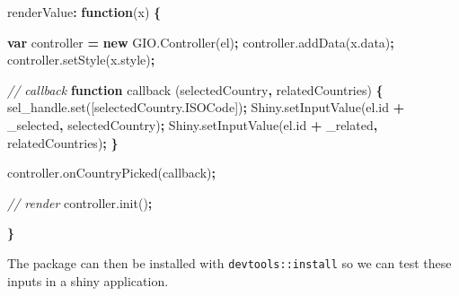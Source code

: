\documentclass[
]{krantz}
\makeatletter
\newenvironment{Shaded}{\begin{snugshade}}{\end{snugshade}}
\newcommand{\AttributeTok}[1]{\textcolor[rgb]{0.61,0.61,0.61}{#1}}
\newcommand{\CommentTok}[1]{\textcolor[rgb]{0.37,0.37,0.37}{\textit{#1}}}
\newcommand{\KeywordTok}[1]{\textcolor[rgb]{0.27,0.27,0.27}{\textbf{#1}}}
\newcommand{\NormalTok}[1]{#1}
\newcommand{\OperatorTok}[1]{\textcolor[rgb]{0.43,0.43,0.43}{\textbf{#1}}}
\newcommand{\StringTok}[1]{\textcolor[rgb]{0.5,0.5,0.5}{#1}}
\newcommand{\VariableTok}[1]{\textcolor[rgb]{0,0,0}{#1}}
\newenvironment{kframe}{%
\medskip{}
\setlength{\fboxsep}{.8em}
 \def\at@end@of@kframe{}%
 \ifinner\ifhmode%
  \def\at@end@of@kframe{\end{minipage}}%
  \begin{minipage}{\columnwidth}%
 \fi\fi%
 \def\FrameCommand##1{\hskip\@totalleftmargin \hskip-\fboxsep
 \colorbox{shadecolor}{##1}\hskip-\fboxsep
     \hskip-\linewidth \hskip-\@totalleftmargin \hskip\columnwidth}%
 \MakeFramed {\advance\hsize-\width
   \@totalleftmargin\z@ \linewidth\hsize
   \@setminipage}}%
 {\par\unskip\endMakeFramed%
 \at@end@of@kframe}
\renewenvironment{Shaded}{\begin{kframe}}{\end{kframe}}
\makeatother
\begin{document}
\begin{Shaded}
\begin{Highlighting}[]
\NormalTok{renderValue}\OperatorTok{:} \KeywordTok{function}\NormalTok{(x) }\OperatorTok{\{}

  \KeywordTok{var}\NormalTok{ controller }\OperatorTok{=} \KeywordTok{new} \VariableTok{GIO}\NormalTok{.}\AttributeTok{Controller}\NormalTok{(el)}\OperatorTok{;}
  \VariableTok{controller}\NormalTok{.}\AttributeTok{addData}\NormalTok{(}\VariableTok{x}\NormalTok{.}\AttributeTok{data}\NormalTok{)}\OperatorTok{;}
  \VariableTok{controller}\NormalTok{.}\AttributeTok{setStyle}\NormalTok{(}\VariableTok{x}\NormalTok{.}\AttributeTok{style}\NormalTok{)}\OperatorTok{;}

  \CommentTok{// callback}
  \KeywordTok{function} \AttributeTok{callback}\NormalTok{ (selectedCountry}\OperatorTok{,}\NormalTok{ relatedCountries) }\OperatorTok{\{}
    \VariableTok{sel\_handle}\NormalTok{.}\AttributeTok{set}\NormalTok{([}\VariableTok{selectedCountry}\NormalTok{.}\AttributeTok{ISOCode}\NormalTok{])}\OperatorTok{;}
    \VariableTok{Shiny}\NormalTok{.}\AttributeTok{setInputValue}\NormalTok{(}\VariableTok{el}\NormalTok{.}\AttributeTok{id} \OperatorTok{+} \StringTok{\textquotesingle{}\_selected\textquotesingle{}}\OperatorTok{,}\NormalTok{ selectedCountry)}\OperatorTok{;}
    \VariableTok{Shiny}\NormalTok{.}\AttributeTok{setInputValue}\NormalTok{(}\VariableTok{el}\NormalTok{.}\AttributeTok{id} \OperatorTok{+} \StringTok{\textquotesingle{}\_related\textquotesingle{}}\OperatorTok{,}\NormalTok{ relatedCountries)}\OperatorTok{;}
  \OperatorTok{\}}

  \VariableTok{controller}\NormalTok{.}\AttributeTok{onCountryPicked}\NormalTok{(callback)}\OperatorTok{;}

  \CommentTok{// render}
  \VariableTok{controller}\NormalTok{.}\AttributeTok{init}\NormalTok{()}\OperatorTok{;}

\OperatorTok{\}}
\end{Highlighting}
\end{Shaded}

The package can then be installed with \texttt{devtools::install} so we can test these inputs in a shiny application.
\end{document}
